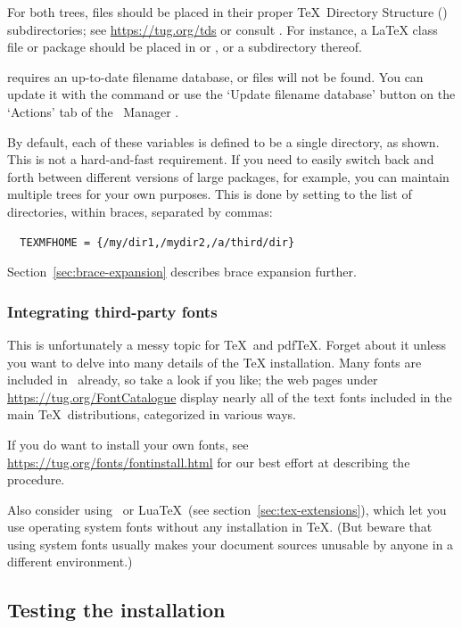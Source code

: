 \documentclass[12pt]{article}
\begin{document}
For both trees, files should be placed in their proper \TeX\ Directory
Structure (\TDS) subdirectories; see \url{https://tug.org/tds} or consult
. For instance, a \LaTeX{} class file or
package should be placed in  or
, or a subdirectory thereof.

 requires an up-to-date filename database, or files
will not be found.  You can update it with the command
 or use the `Update filename database' button on the
`Actions' tab of the \TL\ Manager \GUI.

By default, each of these variables is defined to be a single directory,
as shown.  This is not a hard-and-fast requirement.  If you need to
easily switch back and forth between different versions of large
packages, for example, you can maintain multiple trees for your own
purposes.  This is done by setting  to the
list of directories, within braces, separated by commas:

\begin{verbatim}
  TEXMFHOME = {/my/dir1,/mydir2,/a/third/dir}
\end{verbatim}

Section~\ref{sec:brace-expansion} describes brace expansion further.


\subsubsection{Integrating third-party fonts}

This is unfortunately a messy topic for \TeX\ and pdf\TeX. Forget about
it unless you want to delve into many details of the \TeX{}
installation. Many fonts are included in \TL\ already, so take a look if
you like; the web pages under \url{https://tug.org/FontCatalogue}
display nearly all of the text fonts included in the main \TeX\
distributions, categorized in various ways.

If you do want to install your own fonts, see
\url{https://tug.org/fonts/fontinstall.html} for our best effort at
describing the procedure.

Also consider using \XeTeX\ or Lua\TeX\ (see
section~\ref{sec:tex-extensions}), which let you use operating
system fonts without any installation in \TeX. (But beware that using
system fonts usually makes your document sources unusable by anyone in a
different environment.)

\subsection{Testing the installation}
\label{sec:test-install}
\end{document}
